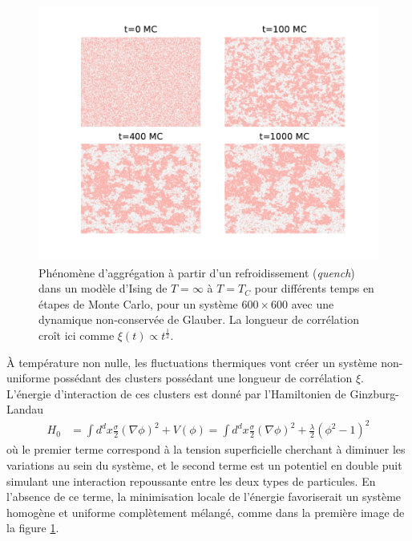 \begin{figure}[h]
    \centering
    \includegraphics[width=0.9\linewidth]{intro/clusterization.pdf}
    \caption{Phénomène d'aggrégation à partir d'un refroidissement (\textit{quench}) dans un modèle d'Ising de $T=\infty$ à $T=T_C$ pour différents temps en étapes de Monte Carlo, pour un système $600 \times 600$ avec une dynamique non-conservée de Glauber. La longueur de corrélation croît ici comme $\xi(t) \propto t^{\frac{1}{2}}$.}
    \label{clusterization}
\end{figure}

À température non nulle, les fluctuations thermiques vont créer un système non-uniforme possédant des clusters possédant une longueur de corrélation $\xi$. L'énergie d'interaction de ces clusters est donné par l'Hamiltonien de Ginzburg-Landau\cite[§ 45]{l_landau_physique_1990}
\begin{align}
    H_0 &= \int d^dx \frac{\sigma}{2}(\nabla \phi)^2 + V(\phi) =  \int d^dx \frac{\sigma}{2}(\nabla \phi)^2 + \frac{\lambda}{2}(\phi^2-1)^2
    \label{hamil-mean-field}
\end{align}
où le premier terme correspond à la tension superficielle cherchant à diminuer les variations au sein du système, et le second terme est un potentiel en double puit simulant une interaction repoussante entre les deux types de particules. En l'absence de ce terme, la minimisation locale de l'énergie favoriserait un système homogène et uniforme complètement mélangé, comme dans la première image de la figure \ref{clusterization}.

